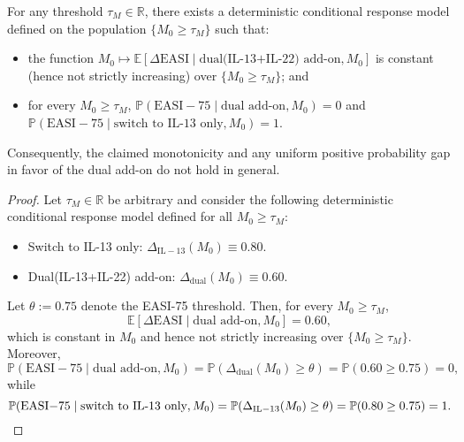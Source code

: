 ﻿\begin{proposition}\label{prop:monotonicity-fails}
For any threshold $\tau_M\in\mathbb{R}$, there exists a deterministic conditional response model defined on the population $\{M_0\ge \tau_M\}$ such that:
\begin{itemize}
  \item the function $M_0\mapsto \mathbb{E}[\Delta\mathrm{EASI}\mid \text{dual(IL-13+IL-22) add-on}, M_0]$ is constant (hence not strictly increasing) over $\{M_0\ge \tau_M\}$; and
  \item for every $M_0\ge \tau_M$, $\mathbb{P}(\mathrm{EASI}{-}75\mid \text{dual add-on}, M_0)=0$ and $\mathbb{P}(\mathrm{EASI}{-}75\mid \text{switch to IL-13 only}, M_0)=1$.
\end{itemize}
Consequently, the claimed monotonicity and any uniform positive probability gap in favor of the dual add-on do not hold in general.
\end{proposition}

\begin{proof}
Let $\tau_M\in\mathbb{R}$ be arbitrary and consider the following deterministic conditional response model defined for all $M_0\ge \tau_M$:
\begin{itemize}
  \item Switch to IL-13 only: $\Delta_{\mathrm{IL}{-}13}(M_0)\equiv 0.80$.
  \item Dual(IL-13+IL-22) add-on: $\Delta_{\mathrm{dual}}(M_0)\equiv 0.60$.
\end{itemize}
Let $\theta:=0.75$ denote the EASI-75 threshold. Then, for every $M_0\ge \tau_M$,
\[
\mathbb{E}[\Delta\mathrm{EASI}\mid \text{dual add-on}, M_0]=0.60,
\]
which is constant in $M_0$ and hence not strictly increasing over $\{M_0\ge \tau_M\}$. Moreover,
\[
\mathbb{P}(\mathrm{EASI}{-}75\mid \text{dual add-on}, M_0)=\mathbb{P}(\Delta_{\mathrm{dual}}(M_0)\ge \theta)=\mathbb{P}(0.60\ge 0.75)=0,
\]
while
\[
\mathbb{P}(\mathrm{EASI}{-}75\mid \text{switch to IL-13 only}, M_0)=\mathbb{P}(\Delta_{\mathrm{IL}{-}13}(M_0)\ge \theta)=\mathbb{P}(0.80\ge 0.75)=1.\qedhere
\]
\end{proof}
